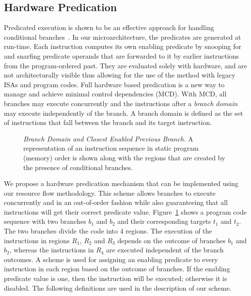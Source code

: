 \documentclass[10pt,twocolumn]{IEEEtran}
\begin{document}
\subsection {Hardware Predication}
\label{sec:hwpred}
%
Predicated execution is shown to be an effective approach for
handling conditional branches~\cite{Mahlke92}. 
In our microarchitecture, the
predicates are generated at run-time.  Each instruction computes
its own enabling predicate by snooping for and snarfing predicate
operands that are forwarded to it by earlier instructions from the
program-ordered past.  They are evaluated solely with hardware,
and are not architecturally visible thus allowing for the use of 
the method with legacy ISAs and program codes.
Full hardware based predication
is a new way to manage and achieve minimal control dependencies
(MCD).  With MCD, all branches may execute concurrently and the
instructions after a \emph{branch domain} ~\cite{Uht91} may execute
independently of the branch.  A branch domain is defined as the 
set of instructions
that fall between the branch and its target instruction.
%
\begin{figure}
{} 
\caption{{\em Branch Domain and Closest Enabled Previous Branch.} 
A representation of an instruction sequence in
static program (memory) order is shown along with the regions
that are created by the presence of conditional branches.}
\label{fig:brdomain}
\end{figure}
%
We propose a hardware predication mechanism that
can be implemented using our resource flow methodology. 
This scheme allows branches to execute concurrently and 
in an out-of-order fashion
while also guaranteeing that all instructions will get their 
correct predicate value.
Figure~\ref{fig:brdomain} shows a program code sequence with two
branches $b_1$ and $b_2$  and their corresponding targets $t_1$ and
$t_2$.  The two branches divide the code into 4 regions.  The
execution of the instructions in regions $R_1$, $R_2$ and $R_3$
depends on the outcome of branches $b_1$ and $b_2$, whereas the
instructions in $R_4$ are executed independent of the branch
outcomes.  A scheme is used for
assigning an enabling predicate to every instruction in each
region based on the outcome of branches.  If the enabling
predicate value is one, then the instruction will be executed;
otherwise it is disabled.  The following definitions are used in
the description of our scheme.
\end{document}
